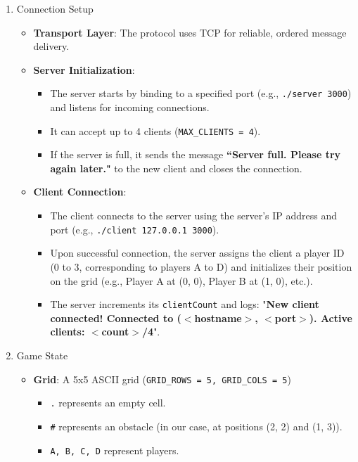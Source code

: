 \documentclass{article}
\begin{document}
\begin{enumerate}
    \item Connection Setup
        \begin {itemize}
            \item \textbf{Transport Layer}: The protocol uses TCP for reliable, ordered message delivery.
            \item \textbf{Server Initialization}:
            \begin {itemize}
                \item The server starts by binding to a specified port (e.g., \texttt{./server 3000}) and listens for incoming connections.
                \item It can accept up to 4 clients (\texttt{MAX\_CLIENTS = 4}).
                \item If the server is full, it sends the message \textbf{``Server full. Please try again later."} to the new client and closes the connection.
            \end {itemize}
            \item \textbf{Client Connection}:
            \begin {itemize}
                \item The client connects to the server using the server's IP address and port (e.g., \texttt{./client 127.0.0.1 3000}).
                \item Upon successful connection, the server assigns the client a player ID (0 to 3, corresponding to players A to D) and initializes their position on the grid (e.g., Player A at (0, 0), Player B at (1, 0), etc.).
                \item The server increments its \texttt{clientCount} and logs: "\textbf{New client connected! Connected to ($<$hostname$>$, $<$port$>$). Active clients: $<$count$>$/4}".
            \end {itemize}
    \end {itemize}
    \item Game State
    \begin {itemize}
        \item \textbf{Grid}: A 5x5 ASCII grid (\texttt{GRID\_ROWS = 5, GRID\_COLS = 5})
        \begin {itemize}
            \item \texttt{.} represents an empty cell.
            \item \texttt{\#} represents an obstacle (in our case, at positions (2, 2) and (1, 3)).
            \item \texttt{A, B, C, D} represent players.

\end{itemize}
\end{itemize}
\end{enumerate}
\end{document}
